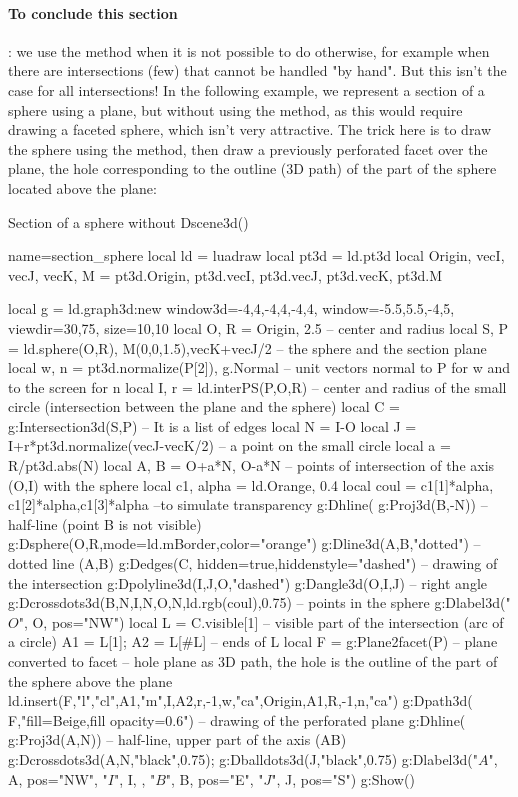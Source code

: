 \paragraph{To conclude this section}: we use the  method when it is not possible to do otherwise, for example when there are intersections (few) that cannot be handled "by hand". But this isn't the case for all intersections! In the following example, we represent a section of a sphere using a plane, but without using the  method, as this would require drawing a faceted sphere, which isn't very attractive. The trick here is to draw the sphere using the  method, then draw a previously perforated facet over the plane, the hole corresponding to the outline (3D path) of the part of the sphere located above the plane:

\begin{demo}{Section of a sphere without Dscene3d()}
\begin{luadraw}{name=section_sphere}
local ld = luadraw
local pt3d = ld.pt3d
local Origin, vecI, vecJ, vecK, M = pt3d.Origin, pt3d.vecI, pt3d.vecJ, pt3d.vecK, pt3d.M

local g = ld.graph3d:new{ window3d={-4,4,-4,4,-4,4}, window={-5.5,5.5,-4,5}, viewdir={30,75}, size={10,10}}
local O, R = Origin, 2.5 -- center and radius
local S, P = ld.sphere(O,R), {M(0,0,1.5),vecK+vecJ/2} -- the sphere and the section plane
local w, n = pt3d.normalize(P[2]), g.Normal -- unit vectors normal to P for w and to the screen for n
local I, r = ld.interPS(P,{O,R}) -- center and radius of the small circle (intersection between the plane and the sphere)
local C = g:Intersection3d(S,P) -- It is a list of edges
local N = I-O
local J = I+r*pt3d.normalize(vecJ-vecK/2) -- a point on the small circle
local a = R/pt3d.abs(N)
local A, B = O+a*N, O-a*N -- points of intersection of the axis (O,I) with the sphere
local c1, alpha = ld.Orange, 0.4
local coul = {c1[1]*alpha, c1[2]*alpha,c1[3]*alpha} --to simulate transparency
g:Dhline( g:Proj3d({B,-N})) -- half-line (point B is not visible)
g:Dsphere(O,R,{mode=ld.mBorder,color="orange"})
g:Dline3d(A,B,"dotted") -- dotted line (A,B)
g:Dedges(C, {hidden=true,hiddenstyle="dashed"}) -- drawing of the intersection
g:Dpolyline3d({I,J,O},"dashed")
g:Dangle3d(O,I,J) -- right angle
g:Dcrossdots3d({{B,N},{I,N},{O,N}},ld.rgb(coul),0.75) -- points in the sphere
g:Dlabel3d("$O$", O, {pos="NW"})
local L = C.visible[1] -- visible part of the intersection (arc of a circle)
A1 = L[1]; A2 = L[#L] -- ends of L
local F = g:Plane2facet(P) -- plane converted to facet
-- hole plane as 3D path, the hole is the outline of the part of the sphere above the plane
ld.insert(F,{"l","cl",A1,"m",I,A2,r,-1,w,"ca",Origin,A1,R,-1,n,"ca"})
g:Dpath3d( F,"fill=Beige,fill opacity=0.6") -- drawing of the perforated plane
g:Dhline( g:Proj3d({A,N})) -- half-line, upper part of the axis (AB)
g:Dcrossdots3d({A,N},"black",0.75); g:Dballdots3d(J,"black",0.75)
g:Dlabel3d("$A$", A, {pos="NW"}, "$I$", I, {}, "$B$", B, {pos="E"}, "$J$", J, {pos="S"})
g:Show()
\end{luadraw}
\end{demo}
